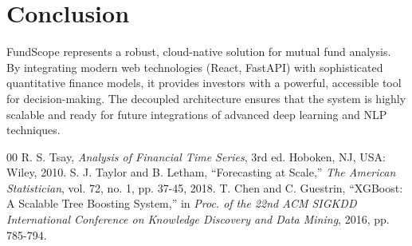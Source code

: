 \documentclass[conference]{IEEEtran}
\begin{document}
\section{Conclusion}
FundScope represents a robust, cloud-native solution for mutual fund analysis. By integrating modern web technologies (React, FastAPI) with sophisticated quantitative finance models, it provides investors with a powerful, accessible tool for decision-making. The decoupled architecture ensures that the system is highly scalable and ready for future integrations of advanced deep learning and NLP techniques.

\begin{thebibliography}{00}
 R. S. Tsay, \textit{Analysis of Financial Time Series}, 3rd ed. Hoboken, NJ, USA: Wiley, 2010.
 S. J. Taylor and B. Letham, ``Forecasting at Scale,'' \textit{The American Statistician}, vol. 72, no. 1, pp. 37-45, 2018.
 T. Chen and C. Guestrin, ``XGBoost: A Scalable Tree Boosting System,'' in \textit{Proc. of the 22nd ACM SIGKDD International Conference on Knowledge Discovery and Data Mining}, 2016, pp. 785-794.
\end{thebibliography}
\end{document}
